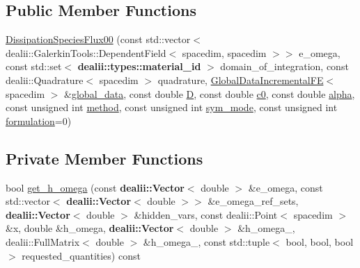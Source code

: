 \subsection*{Public Member Functions}
\begin{DoxyCompactItemize}
\item 
\hyperlink{classincremental_f_e_1_1_dissipation_species_flux00_ae3f514b97d8b6bc751ba9932fb789fbe}{Dissipation\+Species\+Flux00} (const std\+::vector$<$ dealii\+::\+Galerkin\+Tools\+::\+Dependent\+Field$<$ spacedim, spacedim $>$$>$ e\+\_\+omega, const std\+::set$<$ {\bf dealii\+::types\+::material\+\_\+id} $>$ domain\+\_\+of\+\_\+integration, const dealii\+::\+Quadrature$<$ spacedim $>$ quadrature, \hyperlink{classincremental_f_e_1_1_global_data_incremental_f_e}{Global\+Data\+Incremental\+FE}$<$ spacedim $>$ \&\hyperlink{classincremental_f_e_1_1_dissipation_species_flux00_a65f9537f13becd5ee6dfaf597e4e5710}{global\+\_\+data}, const double \hyperlink{classincremental_f_e_1_1_dissipation_species_flux00_aeb62c376743048a919a6d1df5da62677}{D}, const double \hyperlink{classincremental_f_e_1_1_dissipation_species_flux00_a273359d9f5f84374f853a16b95ad7abb}{c0}, const double \hyperlink{classincremental_f_e_1_1_dissipation_species_flux00_a794d510401280099eb0100d4e8d1a040}{alpha}, const unsigned int \hyperlink{classincremental_f_e_1_1_dissipation_species_flux00_ace59a69f460f6d0da34579b58b0b53d6}{method}, const unsigned int \hyperlink{classincremental_f_e_1_1_dissipation_species_flux00_ab16196704d97ae4a31dfd14a03338d19}{sym\+\_\+mode}, const unsigned int \hyperlink{classincremental_f_e_1_1_dissipation_species_flux00_ab25397ec84afda11b60fbe5791a7854b}{formulation}=0)
\end{DoxyCompactItemize}
\subsection*{Private Member Functions}
\begin{DoxyCompactItemize}
\item 
bool \hyperlink{classincremental_f_e_1_1_dissipation_species_flux00_ad94b825998d942b13ac76f15d67efb50}{get\+\_\+h\+\_\+omega} (const {\bf dealii\+::\+Vector}$<$ double $>$ \&e\+\_\+omega, const std\+::vector$<$ {\bf dealii\+::\+Vector}$<$ double $>$$>$ \&e\+\_\+omega\+\_\+ref\+\_\+sets, {\bf dealii\+::\+Vector}$<$ double $>$ \&hidden\+\_\+vars, const dealii\+::\+Point$<$ spacedim $>$ \&x, double \&h\+\_\+omega, {\bf dealii\+::\+Vector}$<$ double $>$ \&h\+\_\+omega\+\_, dealii\+::\+Full\+Matrix$<$ double $>$ \&h\+\_\+omega\+\_, const std\+::tuple$<$ bool, bool, bool $>$ requested\+\_\+quantities) const 
\end{DoxyCompactItemize}
